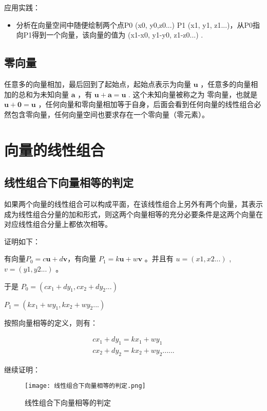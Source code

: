 \documentclass[12pt,oneside]{book}
\begin{document}
应用实践：
\begin{itemize}
\item 分析在向量空间中随便绘制两个点P0 (x0, y0,z0...) P1 (x1, y1, z1...)，从P0指向P1得到一个向量，该向量的值为 (x1-x0, y1-y0, z1-z0...) .
\end{itemize}

\subsection{零向量}
任意多的向量相加，最后回到了起始点，起始点表示为向量 $\boldsymbol{u}$ ，任意多的向量相加的总和为未知向量 $\boldsymbol{a}$ ，有 $\boldsymbol{u} + \boldsymbol{a} = \boldsymbol{u}$ . 这个未知向量被称之为 零向量，也就是  $\boldsymbol{u} + \boldsymbol{0} = \boldsymbol{u}$ ，任何向量和零向量相加等于自身，后面会看到任何向量的线性组合必然包含零向量，任何向量空间也要求存在一个零向量（零元素）。

\section{向量的线性组合}

\subsection{线性组合下向量相等的判定}
如果两个向量的线性组合可以构成平面，在该线性组合上另外有两个向量，其表示成为线性组合分量的加和形式，则这两个向量相等的充分必要条件是这两个向量在对应线性组合分量上都依次相等。

证明如下：

有向量$P_0 = c\boldsymbol{u} + d\boldsymbol{v}$，有向量 $P_1 = k\boldsymbol{u} + w\boldsymbol{v}$ 。并且有 $u = (x1, x2...)$ , $v = (y1, y2...)$ 。

于是
$P_0 = (cx_1+dy_1, cx_2+dy_2...)$

$P_1 = (kx_1+wy_1, kx_2+wy_2...)$

按照向量相等的定义，则有：


\begin{align*}
cx_1+dy_1 = kx_1 + wy_1\\
cx_2+dy_2 = kx_2 + wy_2
......
\end{align*}

继续证明：
\begin{figure}[H]
\centering
\texttt{[image: 线性组合下向量相等的判定.png]}
\caption{线性组合下向量相等的判定}
\end{figure}
\end{document}
